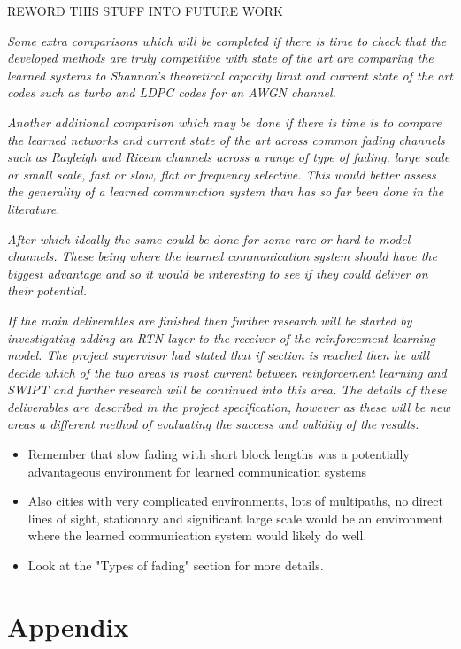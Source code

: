 \documentclass[12pt,onecolumn,letterpaper]{article}
\begin{document}
REWORD THIS STUFF INTO FUTURE WORK

\textit{
Some extra comparisons which will be completed if there is time to check that the developed methods are truly competitive with state of the art are comparing the learned systems to Shannon's theoretical capacity limit and current state of the art codes such as turbo and LDPC codes for an AWGN channel.
}

\textit{
Another additional comparison which may be done if there is time is to compare the learned networks and current state of the art across common fading channels such as Rayleigh and Ricean channels across a range of type of fading, large scale or small scale, fast or slow, flat or frequency selective. This would better assess the generality of a learned communction system than has so far been done in the literature.
}

\textit{
After which ideally the same could be done for some rare or hard to model channels. These being where the learned communication system should have the biggest advantage and so it would be interesting to see if they could deliver on their potential.
}

\textit{
If the main deliverables are finished then further research will be started by investigating adding an RTN layer to the receiver of the reinforcement learning model. The project supervisor had stated that
if section is reached then he will decide which of the two areas is most current between reinforcement learning and SWIPT and further research will be continued into this area. The details of these deliverables are described in the project specification, however as these will be new areas a different method of evaluating the success and validity of the results.
}

\begin{itemize}
   \item Remember that slow fading with short block lengths was a potentially advantageous environment for learned communication systems
   \item Also cities with very complicated environments, lots of multipaths, no direct lines of sight, stationary and significant large scale would be an environment where the learned communication system would likely do well.
   \item Look at the "Types of fading" section for more details.
\end{itemize}


\FloatBarrier
\appendix
\section{Appendix}
\end{document}
